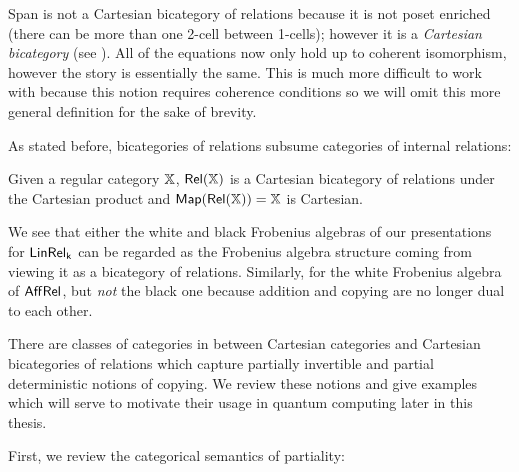 Span is not a Cartesian bicategory of relations because it is not poset enriched (there can be more than one 2-cell between 1-cells); however it is a {\em Cartesian bicategory} (see \cite{carbonia}).  All of the equations now only hold up to coherent isomorphism, however the story is essentially the same. This is much more difficult to work with because this notion requires coherence conditions so we will omit this more general definition for the sake of brevity. 


As stated before, bicategories of relations subsume categories of internal relations:
\begin{example}
Given a regular category $\mathbb{X}$, $\mathsf{Rel}(\mathbb{X})$ is a Cartesian bicategory of relations under the Cartesian product and ${\sf Map}(\mathsf{Rel}(\mathbb{X}))=\mathbb{X}$ is Cartesian.
\end{example}


We see that either the white and black Frobenius algebras of our presentations for $\sf LinRel_k$ can be regarded as the Frobenius algebra structure coming from viewing it as a bicategory of relations.  Similarly, for the white Frobenius algebra of  $\mathsf{Aff}\mathsf{Rel}$, but {\em not} the black one because addition and copying are no longer dual to each other.




There are classes of categories in between Cartesian categories and Cartesian bicategories of relations which capture partially invertible and partial deterministic notions of copying.  We review these notions and give examples which will serve to motivate their usage in quantum computing later in this thesis.





First, we review the categorical semantics of partiality:

\label{sec:rest}


